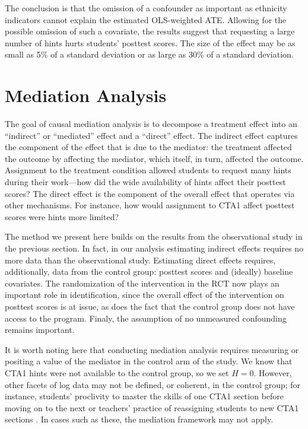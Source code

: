 \documentclass{article}\usepackage[]{graphicx}\usepackage[]{color}
\begin{document}
The conclusion is that the omission of a confounder as important as ethnicity indicators
cannot explain the estimated OLS-weighted ATE.
Allowing for the possible omission of such a covariate, the results suggest that requesting a
large number of hints hurts students' posttest scores.
The size of the effect may be as small as
5\% of a standard deviation
or as large as 30\% of a standard deviation.

\section{Mediation Analysis}\label{sec:mediation}
The goal of causal mediation analysis is to decompose a treatment
effect into an ``indirect'' or ``mediated''
effect and a ``direct'' effect.
The indirect effect captures the component of the effect that is due
to the mediator: the treatment affected the outcome by affecting the
mediator, which itself, in turn, affected the outcome.
Assignment to the treatment condition allowed students to request many
hints during their work---how did the wide availability of hints affect their posttest scores?
The direct effect is the component of the overall effect that operates via other mechanisms.
For instance, how would assignment to CTA1 affect posttest scores were
hints more limited?


The method we present here builds on the results from the observational study in the previous section.
In fact, in our analysis estimating indirect effects requires no more data than the observational study.
Estimating direct effects requires, additionally, data from the control group: posttest scores and (ideally) baseline covariates.
The randomization of the intervention in the RCT now plays an important role in identification, since the overall effect of the intervention on posttest scores is at issue, as does the fact that the control group does not have access to the program.
Finaly, the assumption of no unmeasured confounding remains important.

It is worth noting here that conducting mediation analysis requires
measuring or positing a value of the mediator in the control arm of
the study.
We know that CTA1 hints were not available to the control group, so we
set $H=0$.
However, other facets of log data may not be defined, or coherent, in
the control group; for instance, students' proclivity to master the
skills of one CTA1 section before moving on to the next \citep{aoas}
or teachers' practice of reassigning students to new CTA1 sections
\citep{reassignmentEffect}.
In cases such as these, the mediation framework may not apply.
\end{document}
